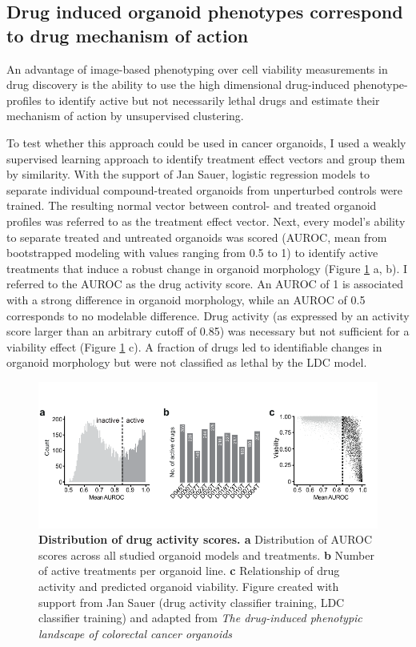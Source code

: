 \begin{flushleft}
\section{Drug induced organoid phenotypes correspond to drug mechanism of action}

An advantage of image-based phenotyping over cell viability measurements in drug discovery is the ability to use the high dimensional drug-induced phenotype-profiles to identify active but not necessarily lethal drugs and estimate their mechanism of action by unsupervised clustering. 

\bigbreak
To test whether this approach could be used in cancer organoids, I used a weakly supervised learning approach to identify treatment effect vectors and group them by similarity. With the support of Jan Sauer, logistic regression models to separate individual compound-treated organoids from unperturbed controls were trained. The resulting normal vector between control- and treated organoid profiles was referred to as the treatment effect vector. Next, every model’s ability to separate treated and untreated organoids was scored (AUROC, mean from bootstrapped modeling with values ranging from 0.5 to 1) to identify active treatments that induce a robust change in organoid morphology (Figure \ref{fig_230} a, b). I referred to the AUROC as the drug activity score. An AUROC of 1 is associated with a strong difference in organoid morphology, while an AUROC of 0.5 corresponds to no modelable difference. Drug activity (as expressed by an activity score larger than an arbitrary cutoff of 0.85) was necessary but not sufficient for a viability effect (Figure \ref{fig_230} c). A fraction of drugs led to identifiable changes in organoid morphology but were not classified as lethal by the LDC model. 

\begin{figure}[h]
\centering
\includegraphics[width=\textwidth,
                height=\textheight,
                keepaspectratio]{figures/promise/pdf/fig_3_0.pdf}
\caption{\textbf{Distribution of drug activity scores. a} Distribution of AUROC scores across all studied organoid models and treatments. \textbf{b} Number of active treatments per organoid line. \textbf{c} Relationship of drug activity and predicted organoid viability. Figure created with support from Jan Sauer (drug activity classifier training, LDC classifier training) and adapted from \textit{The drug-induced phenotypic landscape of colorectal cancer organoids} \cite{Betge2022-kr}}
\label{fig_230}
\end{figure}
\bigbreak


\end{flushleft}
